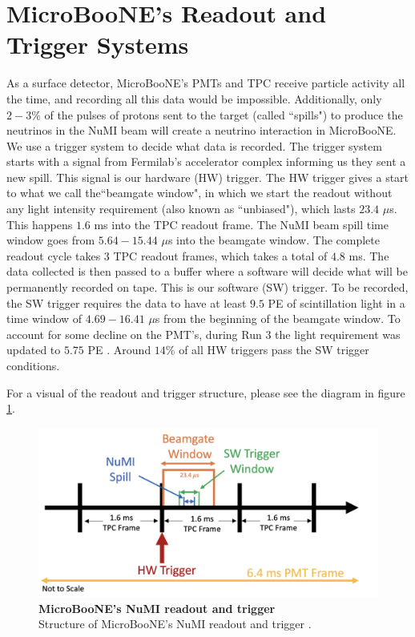 \section{MicroBooNE's Readout and Trigger Systems}
%
As a surface detector, MicroBooNE's PMTs and TPC receive particle activity all the time, and recording all this data would be impossible. Additionally, only $2-3\%$ of the pulses of protons sent to the target (called ``spills") to produce the neutrinos in the NuMI beam will create a neutrino interaction in MicroBooNE. We use a trigger system to decide what data is recorded.
The trigger system starts with a signal from Fermilab's accelerator complex informing us they sent a new spill. This signal is our hardware (HW) trigger. The HW trigger gives a start to what we call the``beamgate window", in which we start the readout without any light intensity requirement (also known as ``unbiased"), which lasts $23.4$ $\mu $s. This happens $1.6$ ms into the TPC readout frame. The NuMI beam spill time window goes from $5.64- 15.44$ $\mu$s into the beamgate window. The complete readout cycle takes 3 TPC readout frames, which takes a total of $4.8$ ms.
The data collected is then passed to a buffer where a software will decide what will be permanently recorded on tape. This is our software (SW) trigger. To be recorded, the SW trigger requires the data to have at least $9.5$ PE of scintillation light in a time window of $4.69- 16.41$ $\mu$s from the beginning of the beamgate window. To account for some decline on the PMT's, during Run 3 the light requirement was updated to $5.75$ PE \cite{numi_redmine}. 
Around $14\%$ of all HW triggers pass the SW trigger conditions. 

For a visual of the readout and trigger structure, please see the diagram in figure \ref{trig}.

\begin{figure}[h!]
    \centering
    \includegraphics[width=150mm]{Figures/numi_trigger.jpg}
    \caption[MicroBooNE's NuMI readout and trigger]{\textbf{MicroBooNE's NuMI readout and trigger}\\Structure of MicroBooNE's NuMI readout and trigger \cite{krish_phd}.}
    \label{trig}
\end{figure}

